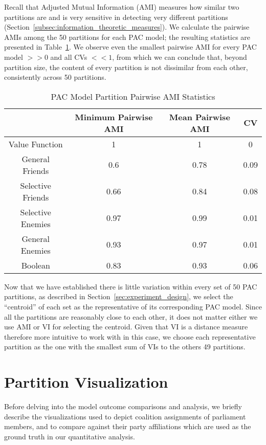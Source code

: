 Recall that Adjusted Mutual Information (AMI) measures how similar two
partitions are and is very sensitive in detecting very different partitions (Section~\ref{subsec:information_theoretic_measures}).
We calculate the pairwise AMIs among the 50 partitions for each PAC model;
the resulting statistics are presented in
Table~\ref{Analysis:table:pac_pairwise_amis}.
We observe even the smallest pairwise AMI for every PAC model $>> 0$ and all CVs
$<< 1$, from which we can conclude that, beyond partition size, the content
of every partition is not dissimilar from each other, consistently across 50
partitions.

\begin{table}[h!]
\centering
\begin{tabular}{|c|c|c|c|}
\hline
       & Minimum Pairwise AMI & Mean Pairwise AMI & CV \\ \hline
Value Function & 1 & 1 & 0 \\
General Friends & 0.6 & 0.78 & 0.09  \\
Selective Friends & 0.66 & 0.84 & 0.08  \\
Selective Enemies & 0.97 & 0.99 & 0.01 \\
General Enemies & 0.93 & 0.97 & 0.01 \\
Boolean & 0.83 & 0.93 & 0.06  \\
\hline
\end{tabular}
\caption{PAC Model Partition Pairwise AMI Statistics}
\label{Analysis:table:pac_pairwise_amis}
\end{table}

Now that we have established there is little variation within every set of 50
PAC partitions, as described in Section~\ref{sec:experiment_design}, we select
the ``centroid'' of each set as the representative of its corresponding PAC model.
Since all the partitions are reasonably close to each other, it does not
matter either we use AMI or VI for selecting the centroid.
Given that VI is a distance measure therefore more intuitive to work with in
this case, we choose each representative partition as the one with the smallest
sum of VIs to the others 49 partitions.

\section{Partition Visualization}
\label{sec:partition_visualization}

Before delving into the model outcome comparisons and analysis, we briefly
describe the visualizations used to depict coalition assignments of parliament members, and to compare against their party affiliations which are
used as the ground truth in our quantitative analysis.

